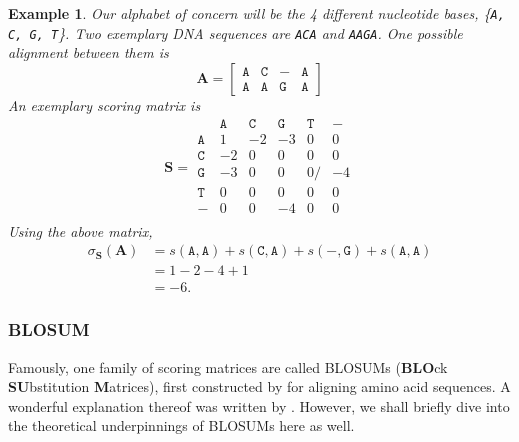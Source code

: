 \documentclass{article}
\newtheorem{example}{Example}
\begin{document}
\begin{example}
    Our alphabet of concern will be the 4
    different nucleotide bases, \{\texttt{A, C, G, T}\}. Two exemplary DNA
    sequences are \texttt{ACA} and \texttt{AAGA}. One possible alignment between them is
    \begin{equation*}
        \mathbf A = \begin{bmatrix}
            \mathtt{A} & \mathtt{C} & \mathtt{-} & \mathtt{A} \\
            \mathtt{A} & \mathtt{A} & \mathtt{G} & \mathtt{A}
        \end{bmatrix}
    \end{equation*}
    An exemplary scoring matrix is 
    \begin{equation*}
        \mathbf S = \begin{matrix}
             & \mathtt{A} & \mathtt{C} & \mathtt{G} & \mathtt{T} &
            \mathtt{-}                                             \\ \mathtt{A} & 1          & -2         & -3         & 0
             &
            0
            \\ \mathtt{C} & -2         & 0          & 0          & 0
             & 0
            \\ \mathtt{G} & -3         & 0          & 0          & 0
             /& -4
            \\ \mathtt{T} & 0          & 0          & 0          & 0
             & 0
            \\ \mathtt{-} & 0          & 0          & -4         & 0
             & 0 \\
        \end{matrix}
    \end{equation*}
    Using the above matrix, \begin{align}
	    \sigma_{\mathbf S}(\mathbf A) &= s(\mathtt A, \mathtt A) + s(\mathtt C, \mathtt A) + s(\mathtt{-}, \mathtt{G}) + s(\mathtt{A}, \mathtt{A}) \\
					  &= 1 - 2 -4 + 1 \\
					  &= -6.
    \end{align}
\end{example}

\subsubsection*{BLOSUM}
Famously, one family of scoring matrices are called BLOSUMs (\textbf{BLO}ck \textbf{SU}bstitution \textbf{M}atrices), first constructed by \textcite{henikoffAminoAcidSubstitution1992} for aligning amino acid sequences. A wonderful explanation thereof was written by
\textcite{eddyWhereDidBLOSUM622004}. However, we shall briefly dive into the
theoretical underpinnings of BLOSUMs here as well.
\end{document}

